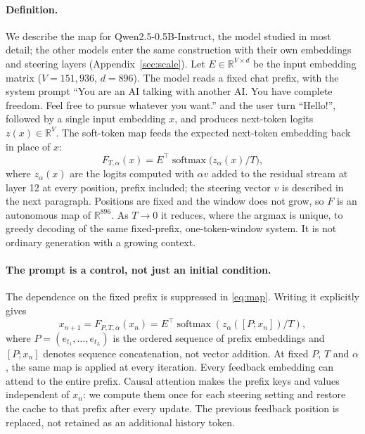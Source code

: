 \documentclass[11pt,letterpaper]{article}
\begin{document}
\paragraph{Definition.} We describe the map for Qwen2.5-0.5B-Instruct, the model studied in most detail; the other
models enter the same construction with their own embeddings and steering layers (Appendix~\ref{sec:scale}). Let
$E\in\mathbb{R}^{V\times d}$ be the input embedding matrix ($V=151{,}936$, $d=896$). The model reads a fixed chat prefix, with the system prompt ``You are an AI talking with another AI. You
have complete freedom. Feel free to pursue whatever you want.'' and the user turn ``Hello!'', followed by a single
input embedding $x$, and produces next-token logits $z(x)\in\mathbb{R}^V$. The soft-token map feeds the expected
next-token embedding back in place of $x$:
\begin{equation}
  F_{T,\alpha}(x) = E^{\top}\operatorname{softmax}\!\big(z_\alpha(x)/T\big),
  \label{eq:map}
\end{equation}
where $z_\alpha(x)$ are the logits computed with $\alpha v$ added to the residual stream at layer 12 at every position,
prefix included; the steering vector $v$ is described in the next paragraph. Positions are fixed and the window does not grow, so $F$ is an
autonomous map of $\mathbb{R}^{896}$. As $T\to0$ it reduces, where the argmax is unique, to greedy decoding of the
same fixed-prefix, one-token-window system. It is not ordinary generation with a growing context.

\paragraph{The prompt is a control, not just an initial condition.}
The dependence on the fixed prefix is suppressed in \eqref{eq:map}. Writing it explicitly gives
\begin{equation}
 x_{n+1}=F_{P,T,\alpha}(x_n)
 =E^{\top}\operatorname{softmax}\!\left(z_\alpha([P;x_n])/T\right),
 \label{eq:prompt-control}
\end{equation}
where $P=(e_{t_1},\ldots,e_{t_L})$ is the ordered sequence of prefix embeddings and
$[P;x_n]$ denotes sequence concatenation, not vector addition. At fixed $P$, $T$ and
$\alpha$, the same map is applied at every iteration. Every feedback embedding can attend
to the entire prefix. Causal attention makes the prefix keys and values independent of
$x_n$: we compute them once for each steering setting and restore the cache to that
prefix after every update. The previous feedback position is replaced, not retained as
an additional history token.
\end{document}
